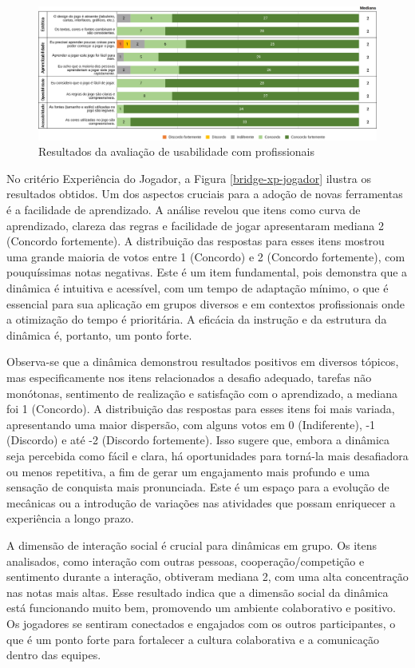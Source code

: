 \documentclass[
	12pt,
	openright,
	twoside,
	a4paper,
	english,
	brazil
	]{abntex2}
\begin{document}
\begin{figure}[H]
	\caption{\label{bridge-usabilidade} Resultados da avaliação de usabilidade com profissionais}
  \includegraphics[width=\textwidth]{bridge-usabilidade}
\end{figure}

No critério Experiência do Jogador, a Figura \ref{bridge-xp-jogador} ilustra os resultados obtidos. Um dos aspectos cruciais para a adoção de novas ferramentas é a facilidade de aprendizado. A análise revelou que itens como curva de aprendizado, clareza das regras e facilidade de jogar apresentaram mediana 2 (Concordo fortemente). A distribuição das respostas para esses itens mostrou uma grande maioria de votos entre 1 (Concordo) e 2 (Concordo fortemente), com pouquíssimas notas negativas. Este é um item fundamental, pois demonstra que a dinâmica é intuitiva e acessível, com um tempo de adaptação mínimo, o que é essencial para sua aplicação em grupos diversos e em contextos profissionais onde a otimização do tempo é prioritária. A eficácia da instrução e da estrutura da dinâmica é, portanto, um ponto forte.

Observa-se que a dinâmica demonstrou resultados positivos em diversos tópicos, mas especificamente nos itens relacionados a desafio adequado, tarefas não monótonas, sentimento de realização e satisfação com o aprendizado, a mediana foi 1 (Concordo). A distribuição das respostas para esses itens foi mais variada, apresentando uma maior dispersão, com alguns votos em 0 (Indiferente), -1 (Discordo) e até -2 (Discordo fortemente). Isso sugere que, embora a dinâmica seja percebida como fácil e clara, há oportunidades para torná-la mais desafiadora ou menos repetitiva, a fim de gerar um engajamento mais profundo e uma sensação de conquista mais pronunciada. Este é um espaço para a evolução de mecânicas ou a introdução de variações nas atividades que possam enriquecer a experiência a longo prazo.

A dimensão de interação social é crucial para dinâmicas em grupo. Os itens analisados, como interação com outras pessoas, cooperação/competição e sentimento durante a interação, obtiveram mediana 2, com uma alta concentração nas notas mais altas. Esse resultado indica que a dimensão social da dinâmica está funcionando muito bem, promovendo um ambiente colaborativo e positivo. Os jogadores se sentiram conectados e engajados com os outros participantes, o que é um ponto forte para fortalecer a cultura colaborativa e a comunicação dentro das equipes.
\end{document}
